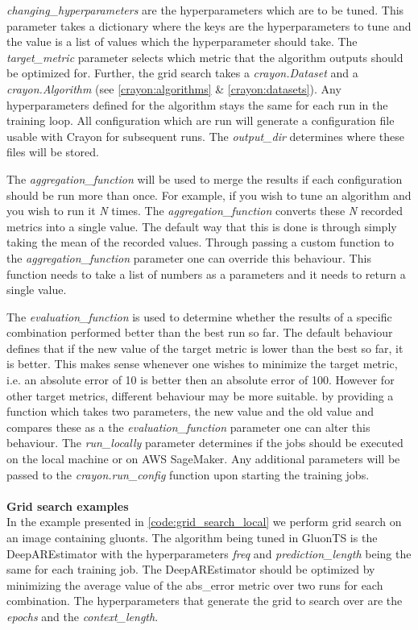 \textit{changing\_hyperparameters} are the hyperparameters which are to be tuned. This parameter takes a dictionary where the keys are the hyperparameters to tune and the value is a list of values which the hyperparameter should take. The \textit{target\_metric} parameter selects which metric that the algorithm outputs should be optimized for. Further, the grid search takes a \textit{crayon.Dataset} and a \textit{crayon.Algorithm} (see \ref{crayon:algorithms} \& \ref{crayon:datasets}). Any hyperparameters defined for the algorithm stays the same for each run in the training loop. All configuration which are run will generate a configuration file usable with Crayon for subsequent runs. The \textit{output\_dir} determines where these files will be stored.

The \textit{aggregation\_function} will be used to merge the results if each configuration should be run more than once. For example, if you wish to tune an algorithm and you wish to run it \textit{N} times. The \textit{aggregation\_function} converts these \textit{N} recorded metrics into a single value. The default way that this is done is through simply taking the mean of the recorded values. Through passing a custom function to the \textit{aggregation\_function} parameter one can override this behaviour. This function needs to take a list of numbers as a parameters and it needs to return a single value.

The \textit{evaluation\_function} is used to determine whether the results of a specific combination performed better than the best run so far. The default behaviour defines that if the new value of the target metric is lower than the best so far, it is better. This makes sense whenever one wishes to minimize the target metric, i.e. an absolute error of 10 is better then an absolute error of 100. However for other target metrics, different behaviour may be more suitable. by providing a function which takes two parameters, the new value and the old value and compares these as a the \textit{evaluation\_function} parameter one can alter this behaviour. The \textit{run\_locally} parameter determines if the jobs should be executed on the local machine or on AWS SageMaker.
Any additional parameters will be passed to the \textit{crayon.run\_config} function upon starting the training jobs.
\\
\\
\textbf{Grid search examples}
\\
In the example presented in \ref{code:grid_search_local} we perform grid search on an image containing gluonts. The algorithm being tuned in GluonTS is the DeepAREstimator with the hyperparameters \textit{freq} and \textit{prediction\_length} being the same for each training job. The DeepAREstimator should be optimized by minimizing the average value of the abs\_error metric over two runs for each combination. The hyperparameters that generate the grid to search over are the \textit{epochs} and the \textit{context\_length}.

